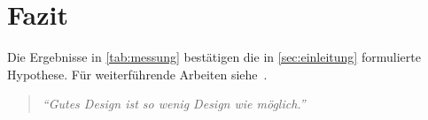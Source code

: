 \section{Fazit}
\label{sec:fazit}

Die Ergebnisse in \cref{tab:messung} bestätigen die in \cref{sec:einleitung}
formulierte Hypothese. Für weiterführende Arbeiten siehe~\cite{lamport1994}.

\begin{quote}
  \textit{``Gutes Design ist so wenig Design wie möglich.''}
\end{quote}
